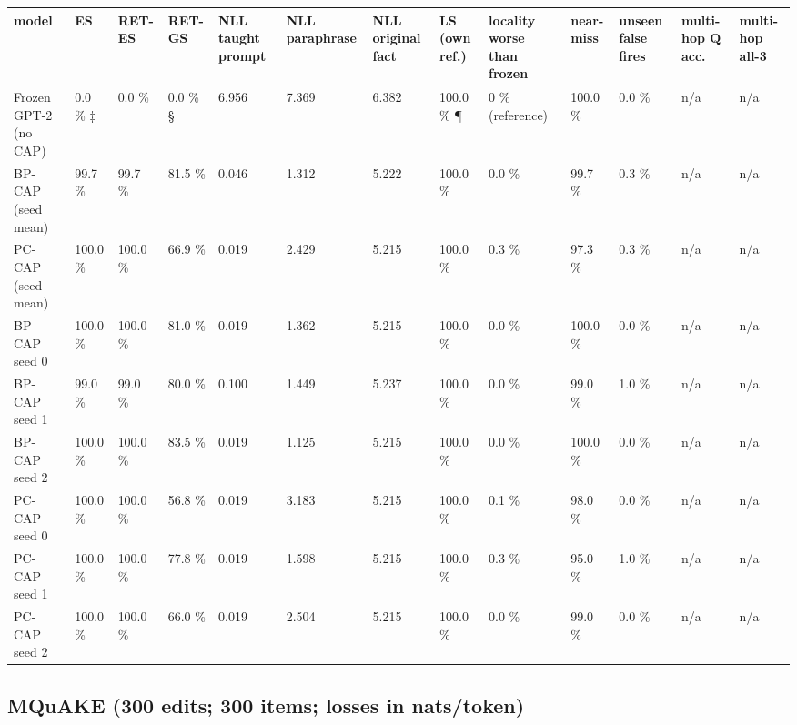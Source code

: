 \documentclass[10pt,a4paper]{article}
\begin{document}
\begin{center}\tiny
\begin{tabularx}{\textwidth}{@{}p{}XXXXXXXXXXXX@{}}
\toprule
model & ES & RET-ES & RET-GS & NLL taught prompt & NLL paraphrase & NLL original fact & LS (own ref.) & locality worse than frozen & near-miss & unseen false fires & multi-hop Q acc. & multi-hop all-3 \\ \midrule
Frozen GPT-2 (no CAP) & 0.0 \% ‡ & 0.0 \% & 0.0 \% § & 6.956 & 7.369 & 6.382 & 100.0 \% ¶ & 0 \% (reference) & 100.0 \% & 0.0 \% & n/a & n/a \\
BP-CAP (seed mean) & 99.7 \% & 99.7 \% & 81.5 \% & 0.046 & 1.312 & 5.222 & 100.0 \% & 0.0 \% & 99.7 \% & 0.3 \% & n/a & n/a \\
PC-CAP (seed mean) & 100.0 \% & 100.0 \% & 66.9 \% & 0.019 & 2.429 & 5.215 & 100.0 \% & 0.3 \% & 97.3 \% & 0.3 \% & n/a & n/a \\
BP-CAP seed 0 & 100.0 \% & 100.0 \% & 81.0 \% & 0.019 & 1.362 & 5.215 & 100.0 \% & 0.0 \% & 100.0 \% & 0.0 \% & n/a & n/a \\
BP-CAP seed 1 & 99.0 \% & 99.0 \% & 80.0 \% & 0.100 & 1.449 & 5.237 & 100.0 \% & 0.0 \% & 99.0 \% & 1.0 \% & n/a & n/a \\
BP-CAP seed 2 & 100.0 \% & 100.0 \% & 83.5 \% & 0.019 & 1.125 & 5.215 & 100.0 \% & 0.0 \% & 100.0 \% & 0.0 \% & n/a & n/a \\
PC-CAP seed 0 & 100.0 \% & 100.0 \% & 56.8 \% & 0.019 & 3.183 & 5.215 & 100.0 \% & 0.1 \% & 98.0 \% & 0.0 \% & n/a & n/a \\
PC-CAP seed 1 & 100.0 \% & 100.0 \% & 77.8 \% & 0.019 & 1.598 & 5.215 & 100.0 \% & 0.3 \% & 95.0 \% & 1.0 \% & n/a & n/a \\
PC-CAP seed 2 & 100.0 \% & 100.0 \% & 66.0 \% & 0.019 & 2.504 & 5.215 & 100.0 \% & 0.0 \% & 99.0 \% & 0.0 \% & n/a & n/a \\
\bottomrule
\end{tabularx}
\end{center}



\subsection*{MQuAKE (300 edits; 300 items; losses in nats/token)}
\end{document}
